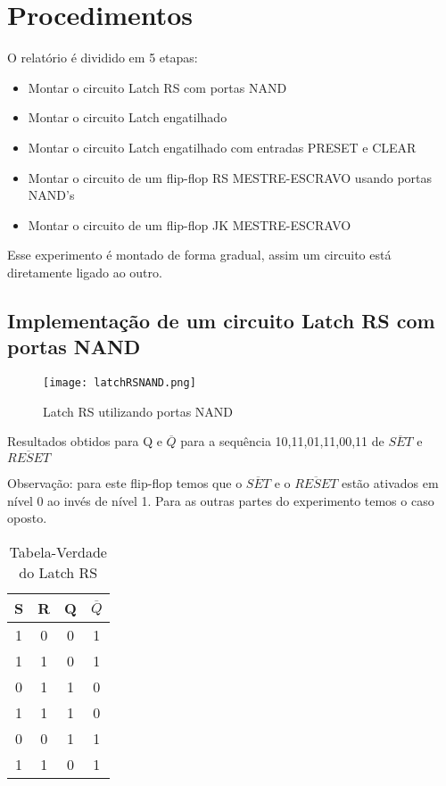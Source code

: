 \documentclass[12pt]{article}
\begin{document}
\section{Procedimentos}
\label{sec:Procedimentos}

O relatório é dividido em 5 etapas:

\begin{itemize}
	\item Montar o circuito Latch RS com portas NAND
	\item Montar o circuito Latch engatilhado
	\item Montar o circuito Latch engatilhado com entradas PRESET e CLEAR
	\item Montar o circuito de um flip-flop RS MESTRE-ESCRAVO usando portas NAND’s
	\item Montar o circuito de um flip-flop JK MESTRE-ESCRAVO
\end{itemize}

Esse experimento é montado de forma gradual, assim um circuito está diretamente ligado ao outro.

\subsection{Implementação de um circuito Latch RS com portas NAND}
\label{sec:2.1}

\begin{figure}[H]
	\centering
	\texttt{[image: latchRSNAND.png]}
	\caption{Latch RS utilizando portas NAND}
	\label{fig:lRSNAND}
\end{figure}

Resultados obtidos para Q e $\overline{Q}$ para a sequência 10,11,01,11,00,11 de $\overline{SET}$ e $\overline{RESET}$

Observação: para este flip-flop temos que o $\overline{SET}$ e o $\overline{RESET}$ estão ativados em nível 0 ao invés de nível 1. Para as outras partes do experimento temos o caso oposto.

\begin{table}[H]
	\centering
	\begin{tabular}{|c|c|c|c|}
		\cline{1-4}
		\multicolumn{1}{|c|}{S} & \multicolumn{1}{|c|}{R} & \multicolumn{1}{|c|}{Q} & \multicolumn{1}{|c|}{$\overline{Q}$} \\
		\hline
		1 & 0 & 0 & 1  \\
		\hline
		1 & 1 & 0 & 1 \\
		\hline
		0 & 1 & 1 & 0  \\
		\hline
		1 & 1 & 1 & 0  \\
		\hline
		0 & 0 & 1 & 1  \\
		\hline
		1 & 1 & 0 & 1  \\
		\hline
	\end{tabular}
	\caption{Tabela-Verdade do Latch RS}
\end{table}
\end{document}
